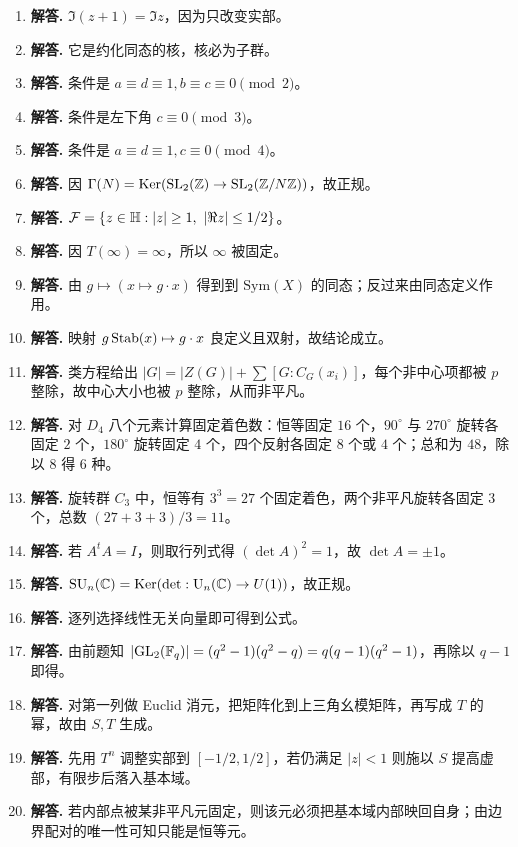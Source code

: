 \begin{enumerate}[label=\textbf{\arabic*.}, leftmargin=*, itemsep=1em]
\item \textbf{解答.} $\Im(z+1)=\Im z$，因为只改变实部。
\item \textbf{解答.} 它是约化同态的核，核必为子群。
\item \textbf{解答.} 条件是 $a\equiv d\equiv1,b\equiv c\equiv0\pmod2$。
\item \textbf{解答.} 条件是左下角 $c\equiv0\pmod3$。
\item \textbf{解答.} 条件是 $a\equiv d\equiv1,c\equiv0\pmod4$。
\item \textbf{解答.} 因 $\Gamma(N)=\mathrm{Ker}(\mathrm{SL}_2(\mathbb{Z})\to\mathrm{SL}_2(\mathbb{Z}/N\mathbb{Z}))$，故正规。
\item \textbf{解答.} $\mathcal F=\{z\in\mathbb{H}:|z|\ge1,\ |\Re z|\le1/2\}$。
\item \textbf{解答.} 因 $T(\infty)=\infty$，所以 $\infty$ 被固定。
\item \textbf{解答.} 由 $g\mapsto(x\mapsto g\cdot x)$ 得到到 $\mathrm{Sym}(X)$ 的同态；反过来由同态定义作用。
\item \textbf{解答.} 映射 $g\operatorname{Stab}(x)\mapsto g\cdot x$ 良定义且双射，故结论成立。
\item \textbf{解答.} 类方程给出 $|G|=|Z(G)|+\sum [G:C_G(x_i)]$，每个非中心项都被 $p$ 整除，故中心大小也被 $p$ 整除，从而非平凡。
\item \textbf{解答.} 对 $D_4$ 八个元素计算固定着色数：恒等固定 $16$ 个，$90^\circ$ 与 $270^\circ$ 旋转各固定 $2$ 个，$180^\circ$ 旋转固定 $4$ 个，四个反射各固定 $8$ 个或 $4$ 个；总和为 $48$，除以 $8$ 得 $6$ 种。
\item \textbf{解答.} 旋转群 $C_3$ 中，恒等有 $3^3=27$ 个固定着色，两个非平凡旋转各固定 $3$ 个，总数 $(27+3+3)/3=11$。
\item \textbf{解答.} 若 $A^tA=I$，则取行列式得 $(\det A)^2=1$，故 $\det A=\pm1$。
\item \textbf{解答.} $\mathrm{SU}_n(\mathbb{C})=\mathrm{Ker}(\det:\mathrm{U}_n(\mathbb{C})\to U(1))$，故正规。
\item \textbf{解答.} 逐列选择线性无关向量即可得到公式。
\item \textbf{解答.} 由前题知 $|\mathrm{GL}_2(\mathbb{F}_q)|=(q^2-1)(q^2-q)=q(q-1)(q^2-1)$，再除以 $q-1$ 即得。
\item \textbf{解答.} 对第一列做 Euclid 消元，把矩阵化到上三角幺模矩阵，再写成 $T$ 的幂，故由 $S,T$ 生成。
\item \textbf{解答.} 先用 $T^n$ 调整实部到 $[-1/2,1/2]$，若仍满足 $|z|<1$ 则施以 $S$ 提高虚部，有限步后落入基本域。
\item \textbf{解答.} 若内部点被某非平凡元固定，则该元必须把基本域内部映回自身；由边界配对的唯一性可知只能是恒等元。

\end{enumerate}
